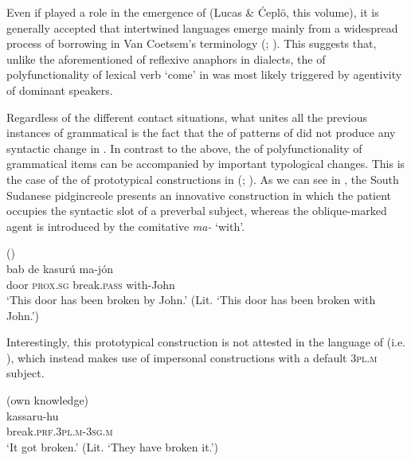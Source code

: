 \documentclass[output=paper]{langsci/langscibook}
\begin{document}
Even if  played a role in the emergence of  (Lucas \& Ćeplö, this volume), it is generally accepted that intertwined languages emerge mainly from a widespread process of borrowing in Van Coetsem’s terminology (\citealt[397]{Winford2005}; \citealt{Manfredi2018}). This suggests that, unlike the aforementioned  of reflexive anaphors in  dialects, the  of polyfunctionality of lexical verb ‘come’ in  was most likely triggered by agentivity of  dominant speakers. 

Regardless of the different contact situations, what unites all the previous instances of grammatical  is the fact that the  of patterns of  did not produce any syntactic change in . In contrast to the above, the  of polyfunctionality of grammatical items can be accompanied by important typological changes. This is the case of the  of prototypical  constructions in   (\citealt[92]{Manfredi2017}; \citeyear[415]{Manfredi2018}). As we can see in , the South Sudanese pidgincreole presents an innovative  construction in which the patient occupies the syntactic slot of a preverbal subject, whereas the oblique-marked agent is introduced by the comitative  \textit{ma-} ‘with’.  

\ea\label{passive}
{  (\citealt[86]{Manfredi2017})}\\
\gll   bab de kasurú ma-jón \\
       door \textsc{prox.sg} break.\textsc{pass} with-John\\
\glt   `This door has been broken by John.' (Lit. ‘This door has been broken with John.’)
\z
 
Interestingly, this prototypical  construction is not attested in the  language of   (i.e.  ), which instead makes use of impersonal  constructions with a default \textsc{3pl.m} subject.

\ea
{  (own knowledge)}\\
\gll   kassaru-hu\\
       break.\textsc{prf.3pl.m-3sg.m}\\
\glt   `It got broken.' (Lit. ‘They have broken it.’) 
\z
\end{document}
